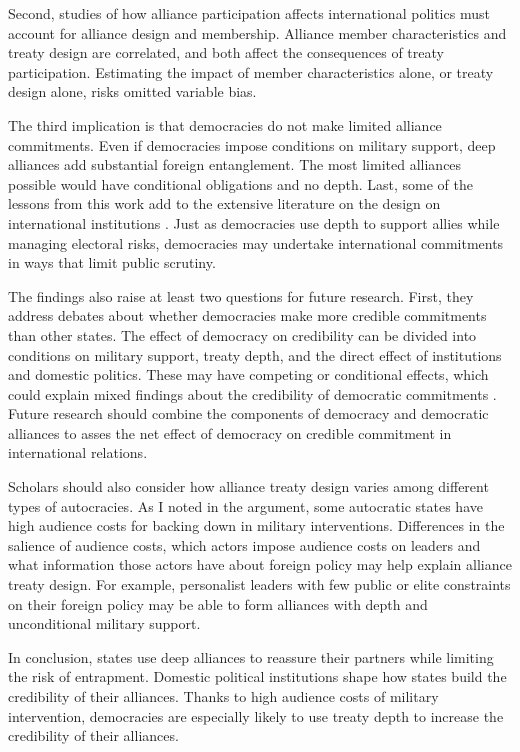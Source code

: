 \documentclass[12pt]{article}
\begin{document}
Second, studies of how alliance participation affects international politics must account for alliance design and membership. 
Alliance member characteristics and treaty design are correlated, and both affect the consequences of treaty participation.   
Estimating the impact of member characteristics alone, or treaty design alone, risks omitted variable bias. 


The third implication is that democracies do not make limited alliance commitments. 
Even if democracies impose conditions on military support, deep alliances add substantial foreign entanglement.
The most limited alliances possible would have conditional obligations and no depth.  
Last, some of the lessons from this work add to the extensive literature on the design on international institutions \citep{DownesRocke1995, MartinSimmons1998, Koremenosetal2001, Koremenos2005, Thompson2010}.
Just as democracies use depth to support allies while managing electoral risks, democracies may undertake international commitments in ways that limit public scrutiny. 


The findings also raise at least two questions for future research.  
First, they address debates about whether democracies make more credible commitments than other states. 
The effect of democracy on credibility can be divided into conditions on military support, treaty depth, and the direct effect of institutions and domestic politics. 
These may have competing or conditional effects, which could explain mixed findings about the credibility of democratic commitments \citep{Schultz1999, Leeds1999, Thyne2012, DownesSechser2012, PotterBaum2014}.
Future research should combine the components of democracy and democratic alliances to asses the net effect of democracy on credible commitment in international relations. 


Scholars should also consider how alliance treaty design varies among different types of autocracies. 
As I noted in the argument, some autocratic states have high audience costs for backing down in military interventions. 
Differences in the salience of audience costs, which actors impose audience costs on leaders and what information those actors have about foreign policy \citep{Weeks2008} may help explain alliance treaty design.
For example, personalist leaders with few public or elite constraints on their foreign policy may be able to form alliances with depth and unconditional military support. 


In conclusion, states use deep alliances to reassure their partners while limiting the risk of entrapment. 
Domestic political institutions shape how states build the credibility of their alliances.
Thanks to high audience costs of military intervention, democracies are especially likely to use treaty depth to increase the credibility of their alliances. 



\singlespace
 
 
\end{document}
